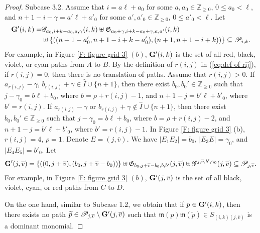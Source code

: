 \documentclass[12pt, reqno]{amsart}
\numberwithin{equation}{section}
\newcommand{\ZZ}{\mathbb{Z}}
\begin{document}
{\begin{proof}
Subcase 3.2. Assume that $i=a \ell+a_0$ for some $a, a_0\in \mathbb{Z}_{\geq 0}$, $0\leq a_0< \ell$, and $n+1-i-\gamma=a' \ell+a'_0$ for some $a', a'_0\in \mathbb{Z}_{\geq 0}$, $0\leq a'_0< \ell$. Let
\begin{align*}
{\bf G'}(i,k)=&\mathscr{G}_{a_0, i+k-a_0, a, \gamma}(i,k)\uplus \mathfrak{G}_{a_0+\gamma, i+k-a_0+\gamma, a, a' }(i,k)\\
&\uplus \{((n+1-a'_0, n+1-i+k-a'_0),(n+1,n+1-i+k))\} \subseteq \mathscr{P}_{i,k}.
\end{align*}
For example, in Figure \ref{F: figure grid 3} $(b)$, ${\bf G'}(i,k)$ is the set of all red, black, violet, or cyan paths from $A$ to $B$.
By the definition of $r(i,j)$ in (\ref{eq:def of rij}), if $r(i,j)=0$, then there is no translation of paths. Assume that $r(i,j)>0$. If $a_{r(i,j)}-\gamma$, $b_{r(i,j)}+\gamma\in \hat{I}\cup\{n+1\}$, then there exist $b_0, b_0' \in \ZZ_{\ge 0}$ such that $j-\gamma_0=b \ell+b_0$, where $b=\rho+r(i,j)-1$, and $n+1-j=b' \ell+b'_0$, where $b'=r(i,j)$. If $a_{r(i,j)}-\gamma$ or $b_{r(i,j)}+\gamma\notin \hat{I}\cup\{n+1\}$, then there exist $b_0, b_0'\in \ZZ_{\geq 0}$ such that $j-\gamma_0=b \ell+b_0$, where $b=\rho+r(i,j)-2$, and $n+1-j=b' \ell+b'_0$, where $b'=r(i,j)-1$. In Figure \ref{F: figure grid 3} (b), $r(i,j)=4$, $\rho=1$. Denote $E=(j,\overline{v})$. We have $|E_1E_2|=b_0$, $|E_3E|=\gamma_0$, and $|E_4E_5|=b'_0$. Let
\begin{align*}
{\bf G'}(j,\overline{v})=\{((0,j+\overline{v}),(b_0,j+\overline{v}-b_0))\}\uplus\mathfrak{G}_{b_0,j+\overline{v}-b_0, b, b'}(j,\overline{v})\uplus \mathscr{G}^{j, \overline{v}, b', \gamma_0}(j,\overline{v}) \subseteq \mathscr{P}_{j,\overline{v}}.
\end{align*}
For example, in Figure \ref{F: figure grid 3} $(b)$, ${\bf G'}(j,\overline{v})$ is the set of all black, violet, cyan, or red paths from $C$ to $D$.

On the one hand, similar to Subcase 1.2, we obtain that if $p \in {\bf G'}(i,k)$, then there exists no path $\widetilde{p}\in \mathscr{P}_{j, \overline{v}}\setminus{\bf G'}(j,\overline{v})$ such that $\mathfrak{m}(p)\mathfrak{m}(\widetilde{p}) \in S_{(i, k)(j, \overline{v})}$ is a dominant monomial.


\end{proof}}
\end{document}
